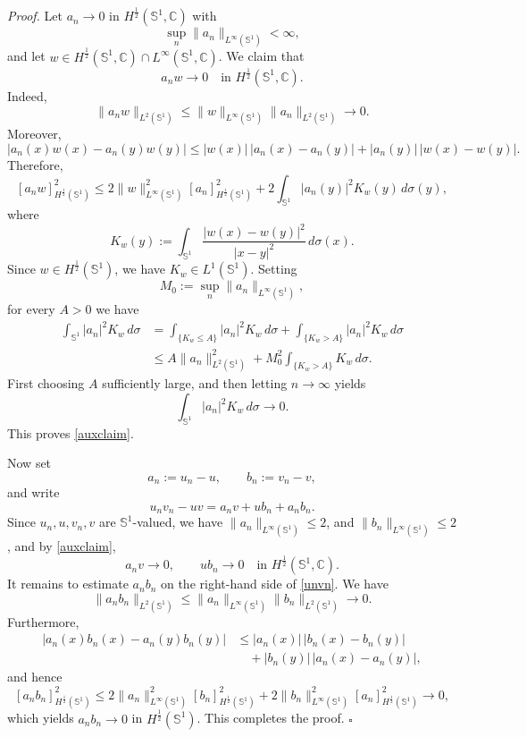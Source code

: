 \documentclass[12pt, a4paper]{article}
\newenvironment{proof}{\noindent\emph{Proof.}}{\hfill$\square$\medskip}
\newcommand{\sph}{\mathbb{S}}
\renewcommand{\(}{\left(}
\renewcommand{\)}{\right)}
\begin{document}
\begin{proof}
Let $a_n\to 0$  in
$H^{\frac12}(\sph^1,\mathbb C)$ with
\[
\sup_n\|a_n\|_{L^\infty(\sph^1)}<\infty,
\]
and let $w\in H^{\frac12}(\sph^1,\mathbb C)\cap L^\infty(\sph^1,\mathbb C)$.
We claim that
\begin{equation}\label{auxclaim}
a_nw\to0
\quad\text{in }H^{\frac12}(\sph^1,\mathbb C).
\end{equation}
Indeed,
\[
\|a_nw\|_{L^2(\sph^1)}
\le
\|w\|_{L^\infty(\sph^1)}\|a_n\|_{L^2(\sph^1)}
\to0.
\]
Moreover,
\[
|a_n(x)w(x)-a_n(y)w(y)|
\le
|w(x)|\,|a_n(x)-a_n(y)| +
|a_n(y)|\,|w(x)-w(y)|.
\]
Therefore,
\[
[a_nw]_{H^{\frac12}(\sph^1)}^2
\le
2\|w\|_{L^\infty(\sph^1)}^2[a_n]_{H^{\frac12}(\sph^1)}^2
+
2\int_{\sph^1}|a_n(y)|^2K_w(y)\,d\sigma(y),
\]
where
\[
K_w(y)
:=
\int_{\sph^1}
\frac{|w(x)-w(y)|^2}{|x-y|^2}\,d\sigma(x).
\]
Since $w\in H^{\frac12}(\sph^1)$, we have $K_w\in L^1(\sph^1)$. Setting
\[
M_0:=\sup_n\|a_n\|_{L^\infty(\sph^1)},
\]
for every $A>0$ we have
\[
\begin{aligned}
\int_{\sph^1}|a_n|^2K_w\,d\sigma
&=
\int_{\{K_w\le A\}}|a_n|^2K_w\,d\sigma
+
\int_{\{K_w>A\}}|a_n|^2K_w\,d\sigma \\
&\le
A\|a_n\|_{L^2(\sph^1)}^2
+
M_0^2\int_{\{K_w>A\}}K_w\,d\sigma.
\end{aligned}
\]
First choosing $A$ sufficiently large, and then letting $n\to\infty$ yields
\[
\int_{\sph^1}|a_n|^2K_w\,d\sigma\to0.
\]
This proves \eqref{auxclaim}.

Now set
\[
a_n:=u_n-u,
\qquad
b_n:=v_n-v,
\]
and write
\begin{equation}\label{unvn}
u_nv_n-uv
=
a_nv+ub_n+a_nb_n.
\end{equation}
Since $u_n,u,v_n,v$ are $\sph^1$-valued, we have
$\|a_n\|_{L^\infty(\sph^1)}
\le2$,
and $\|b_n\|_{L^\infty(\sph^1)}
\le2$, and by \eqref{auxclaim},
\[
a_nv\to0,
\qquad
ub_n\to0
\quad\text{in }H^{\frac12}(\sph^1,\mathbb{C}).
\]
It remains to estimate $a_nb_n$ on the right-hand side of \eqref{unvn}. We have
\[
\|a_nb_n\|_{L^2(\sph^1)}
\le
\|a_n\|_{L^\infty(\sph^1)}\|b_n\|_{L^2(\sph^1)}
\to0.
\]
Furthermore,
\[
\begin{aligned}
|a_n(x)b_n(x)-a_n(y)b_n(y)|
&\le
|a_n(x)|\,|b_n(x)-b_n(y)| \\
&\quad+
|b_n(y)|\,|a_n(x)-a_n(y)|,
\end{aligned}
\]
and hence
\[
[a_nb_n]_{H^{\frac12}(\sph^1)}^2
\le
2\|a_n\|_{L^\infty(\sph^1)}^2[b_n]_{H^{\frac12}(\sph^1)}^2
+
2\|b_n\|_{L^\infty(\sph^1)}^2[a_n]_{H^{\frac12}(\sph^1)}^2
\to0,
\]
which yields $a_nb_n\to0$ in $H^{\frac12}(\sph^1)$. This completes the proof.
\end{proof}
\end{document}
